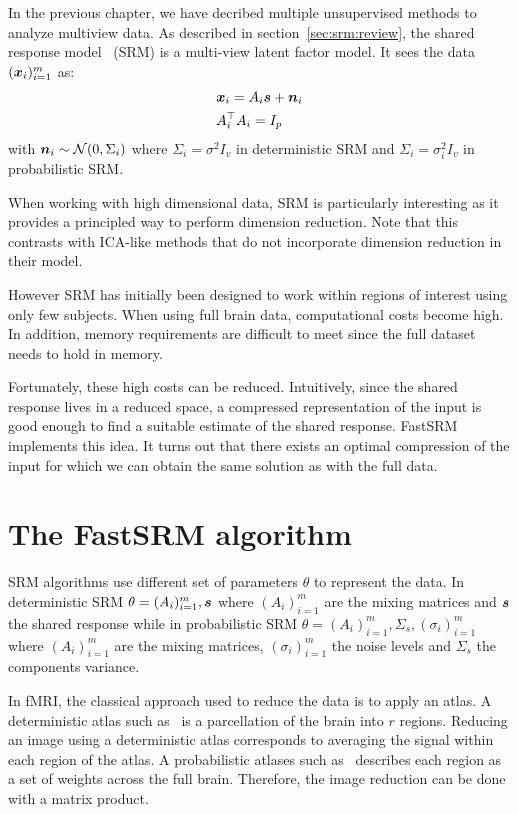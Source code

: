 In the previous chapter, we have decribed multiple unsupervised methods to analyze
multiview data.
As described in section~\ref{sec:srm:review}, the shared response
model~\cite{chen2015reduced} (SRM) is a multi-view latent factor model. It sees
the data $(\boldsymbol{x}_i)_{i=1}^m$ as:
\begin{align}
  &\boldsymbol{x}_i = A_i \boldsymbol{s} + \boldsymbol{n}_i \\
  &A_i^{\top}A_i = I_p
\end{align}
with $\boldsymbol{n}_i \sim \mathcal{N}(0, \Sigma_i)$ where $\Sigma_i = \sigma^2 I_v$ in
deterministic SRM and $\Sigma_i = \sigma_i^2 I_v$ in probabilistic SRM.

When working with high dimensional data, SRM is particularly
interesting as it provides a principled way to perform dimension reduction. Note that this
contrasts with ICA-like methods that do not incorporate dimension reduction in their model.

However SRM has initially been designed to work within regions of interest using
only few subjects. When using full brain data, computational costs become
high. In addition, memory requirements are difficult to meet since the full dataset needs to hold
in memory.

Fortunately, these high costs can be reduced. Intuitively, since the shared
response lives in a reduced space, a compressed representation of the input is
good enough to find a suitable estimate of the shared response.
FastSRM implements this idea. It turns out that there exists an optimal
compression of the input for which we can obtain the same solution as
with the full data.

\section{The FastSRM algorithm}
SRM algorithms use different set of parameters $\theta$ to represent the data.
In deterministic SRM $\theta = (A_i)_{i=1}^m, \boldsymbol{s}$ where $(A_i)_{i=1}^m$ are the
mixing matrices and $\boldsymbol{s}$ the shared response while in probabilistic SRM $\theta
= (A_i)_{i=1}^m, \Sigma_s, (\sigma_i)_{i=1}^m$ where $(A_i)_{i=1}^m$ are the
mixing matrices, $(\sigma_i)_{i=1}^m$ the noise levels and $\Sigma_s$ the
components variance.

In fMRI, the classical approach used to reduce the data is to apply an atlas.
A deterministic atlas such as~\cite{bellec2010multi} is a parcellation of the
brain into $r$ regions. Reducing an image using a deterministic atlas corresponds to
averaging the signal within each region of the atlas. A probabilistic atlases such
as~\cite{dadi_fine-grain_2020} describes each region as a set of weights across
the full brain. Therefore, the image reduction can be done with a matrix product.

